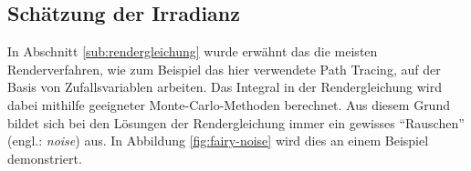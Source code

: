 



	\subsection{Schätzung der Irradianz} %
	\label{sub:schaetzung_der_irradianz}

		In Abschnitt \ref{sub:rendergleichung} wurde erwähnt das die meisten Renderverfahren, wie zum Beispiel das hier verwendete Path Tracing, auf der Basis von Zufallsvariablen arbeiten.
		Das Integral in der Rendergleichung wird dabei mithilfe geeigneter Monte-Carlo-Methoden berechnet.
		Aus diesem Grund bildet sich bei den Lösungen der Rendergleichung immer ein gewisses \enquote{Rauschen} (engl.: \textit{noise}) aus.
		In Abbildung \ref{fig:fairy-noise} wird dies an einem Beispiel demonstriert.

